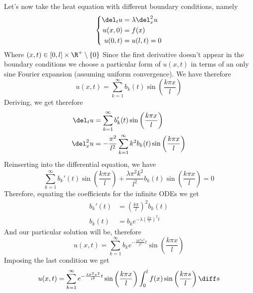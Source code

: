 \documentclass[../mmf.tex]{subfiles}
\begin{document}
\begin{eg}
	Let's now take the heat equation with different boundary conditions, namely
	\begin{equation*}
		 \left\{\begin{aligned}
				 \del_tu&=\lambda\del^2_{x}u\\
				 u(x,0)&=f(x)\\
				 u(0,t)&=u(l,t)=0
		 \end{aligned}\right.
	\end{equation*}
	Where $(x,t)\in[0,l]\times\R^+\setminus\{0\}$
	Since the first derivative doesn't appear in the boundary conditions we choose a particular form of $u(x,t)$ in terms of an only sine Fourier expansion (assuming uniform convergence). We have therefore
	\begin{equation*}
		u(x,t)=\sum_{k=1}^{\infty}b_k(t)\sin\left( \frac{k\pi x}{l} \right)
	\end{equation*}
	Deriving, we get therefore
	\begin{equation*}
		\begin{aligned}
			\del_tu&=\sum_{k=1}^{\infty}b_k'(t)\sin\left( \frac{k\pi x}{l} \right)\\
			\del^2_xu&=-\frac{\pi^2}{l^2}\sum_{k=1}^{\infty}k^2b_k(t)\sin\left( \frac{k\pi x}{l} \right)
		\end{aligned}
	\end{equation*}
	Reinserting into the differential equation, we have
	\begin{equation*}
		\sum_{k=1}^{\infty}b_k'(t)\sin\left( \frac{k\pi x}{l} \right)+\frac{\lambda\pi^2k^2}{l^2}b_k(t)\sin\left( \frac{k\pi x}{l} \right)=0
	\end{equation*}
	Therefore, equating the coefficients for the infinite ODEs we get
	\begin{equation*}
		\begin{aligned}
			b_k'(t)&=\left( \frac{k\pi}{l} \right)^2b_k(t)\\
			b_k(t)&=b_ke^{-\lambda\left( \frac{k\pi}{l} \right)^2t}
		\end{aligned}
	\end{equation*}
	And our particular solution will be, therefore
	\begin{equation*}
		u(x,t)=\sum_{k=1}^{\infty}b_ke^{-\frac{\lambda k^2\pi^2}{l^2}t}\sin\left( \frac{k\pi x}{l} \right)
	\end{equation*}
	Imposing the last condition we get
	\begin{equation*}
		u(x,t)=\sum_{k=1}^{\infty}e^{-\frac{\lambda k^2\pi^2}{l^2}t}\sin\left( \frac{k\pi x}{l} \right)\int_{0}^{l}f(x)\sin\left( \frac{k\pi s}{l} \right)\diff s
	\end{equation*}
\end{eg}
\end{document}
